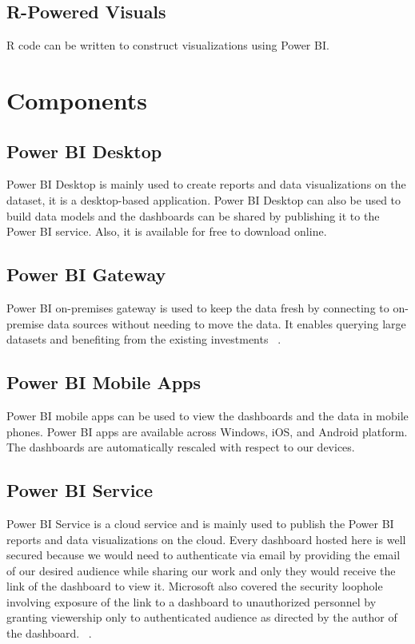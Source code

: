 \subsection{R-Powered Visuals}
R code can be written to construct visualizations using Power BI\@.

\section{Components}

\subsection{Power BI Desktop}
Power BI Desktop is mainly used to create reports and data visualizations on
the dataset, it is a desktop-based application. Power BI Desktop can also be used to 
build data models and the dashboards can be shared by publishing it to the Power BI service. 
Also, it is available for free to download online.

\subsection{Power BI Gateway}
Power BI on-premises gateway is used to keep the data fresh 
by connecting to on-premise data sources without needing to move the data. It 
enables querying large datasets and benefiting from the existing investments
~\cite{hid-sp18-418-powerbi-components}.

\subsection{Power BI Mobile Apps}
Power BI mobile apps can be used to view the dashboards and the data in mobile 
phones. Power BI apps are available across Windows, iOS, and Android platform. 
The dashboards are automatically rescaled with respect to our devices.

\subsection{Power BI Service}
Power BI Service is a cloud service and is mainly used to publish the 
Power BI reports and data visualizations on the cloud. Every dashboard hosted 
here is well secured because we would need to authenticate via email by providing 
the email of our desired audience while sharing our work and only they would receive the 
link of the dashboard to view it. Microsoft also covered the security loophole involving exposure 
of the link to a dashboard to unauthorized personnel by granting viewership only to 
authenticated audience as directed by the author of the dashboard.
~\cite{hid-sp18-418-powerbi-components}.

